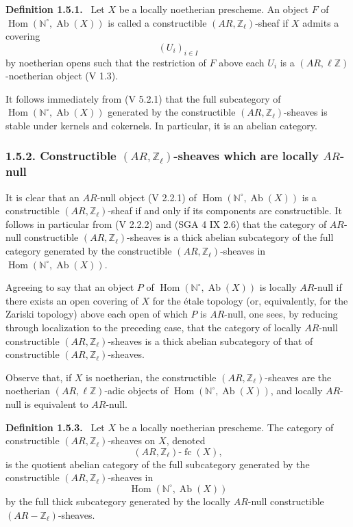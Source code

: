 \documentclass[11pt]{article}
\newenvironment{statement}[1]{\par\medskip\noindent\textbf{#1.}\ }{\par\medskip}
\DeclareMathOperator{\Hom}{Hom}
\providecommand{\Hom}{\operatorname{Hom}}
\providecommand{\Ab}{\operatorname{Ab}}
\providecommand{\fc}{\operatorname{fc}}
\providecommand{\Ab}{\operatorname{Ab}}
\providecommand{\Hom}{\operatorname{Hom}}
\begin{document}
\begin{statement}{Definition 1.5.1}
Let \(X\) be a locally noetherian prescheme. An object \(F\) of \(\Hom(\mathbb N^\circ,\Ab(X))\) is called a constructible \((AR,\mathbb Z_\ell)\)-sheaf if \(X\) admits a covering
\[
(U_i)_{i\in I}
\]
by noetherian opens such that the restriction of \(F\) above each \(U_i\) is a \((AR,\ell\mathbb Z)\)-noetherian object (V 1.3).
\end{statement}

It follows immediately from (V 5.2.1) that the full subcategory of \(\Hom(\mathbb N^\circ,\Ab(X))\) generated by the constructible \((AR,\mathbb Z_\ell)\)-sheaves is stable under kernels and cokernels. In particular, it is an abelian category.

\subsubsection*{1.5.2. Constructible \((AR,\mathbb Z_\ell)\)-sheaves which are locally \(AR\)-null}

It is clear that an \(AR\)-null object (V 2.2.1) of \(\Hom(\mathbb N^\circ,\Ab(X))\) is a constructible \((AR,\mathbb Z_\ell)\)-sheaf if and only if its components are constructible. It follows in particular from (V 2.2.2) and (SGA 4 IX 2.6) that the category of \(AR\)-null constructible \((AR,\mathbb Z_\ell)\)-sheaves is a thick abelian subcategory of the full category generated by the constructible \((AR,\mathbb Z_\ell)\)-sheaves in \(\Hom(\mathbb N^\circ,\Ab(X))\).

Agreeing to say that an object \(P\) of \(\Hom(\mathbb N^\circ,\Ab(X))\) is locally \(AR\)-null if there exists an open covering of \(X\) for the étale topology (or, equivalently, for the Zariski topology) above each open of which \(P\) is \(AR\)-null, one sees, by reducing through localization to the preceding case, that the category of locally \(AR\)-null constructible \((AR,\mathbb Z_\ell)\)-sheaves is a thick abelian subcategory of that of constructible \((AR,\mathbb Z_\ell)\)-sheaves.

Observe that, if \(X\) is noetherian, the constructible \((AR,\mathbb Z_\ell)\)-sheaves are the noetherian \((AR,\ell\mathbb Z)\)-adic objects of \(\Hom(\mathbb N^\circ,\Ab(X))\), and locally \(AR\)-null is equivalent to \(AR\)-null.

\begin{statement}{Definition 1.5.3}
Let \(X\) be a locally noetherian prescheme. The category of constructible \((AR,\mathbb Z_\ell)\)-sheaves on \(X\), denoted
\[
(AR,\mathbb Z_\ell)\text{-}\fc(X),
\]
is the quotient abelian category of the full subcategory generated by the constructible \((AR,\mathbb Z_\ell)\)-sheaves in
\[
\Hom(\mathbb N^\circ,\Ab(X))
\]
by the full thick subcategory generated by the locally \(AR\)-null constructible \((AR-\mathbb Z_\ell)\)-sheaves.
\end{statement}
\end{document}
